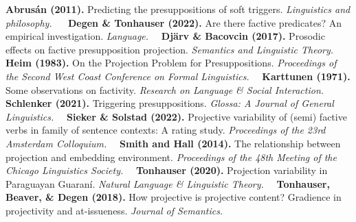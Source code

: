 \documentclass[12pt, a4paper]{article}
\begin{document}
\newpage
{\scriptsize
{}
%
{\bf Abrusán (2011).} Predicting the presuppositions of soft triggers. {\em Linguistics and philosophy.} ~\textbullet~
{\bf Degen \& Tonhauser (2022).} Are there factive predicates? An empirical investigation. {\em Language.}~\textbullet~
{\bf Djärv \& Bacovcin (2017).} Prosodic effects on factive presupposition projection. {\em Semantics and Linguistic Theory.}~\textbullet~
{\bf Heim (1983).} On the Projection Problem for Presuppositions. {\em Proceedings of the Second West Coast Conference on Formal Linguistics.}~\textbullet~
{\bf Karttunen (1971).} Some observations on factivity. {\em Research on Language \& Social Interaction.} ~\textbullet~
{\bf Schlenker (2021).} Triggering presuppositions. {\em Glossa: A Journal of General Linguistics.}~\textbullet~
{\bf Sieker \& Solstad (2022).} Projective variability of (semi) factive verbs in family of sentence contexts: A rating study. {\em Proceedings of the 23rd Amsterdam Colloquium.}~\textbullet~
{\bf Smith and Hall (2014).} The relationship between projection and embedding environment. {\em Proceedings of the 48th Meeting of the Chicago Linguistics Society.}~\textbullet~
{\bf Tonhauser (2020).} Projection variability in Paraguayan Guaraní. {\em Natural Language \& Linguistic Theory.}~\textbullet~
{\bf Tonhauser, Beaver, \& Degen (2018).} How projective is projective content? Gradience in projectivity and at-issueness. {\em Journal of Semantics.}



}
\end{document}
